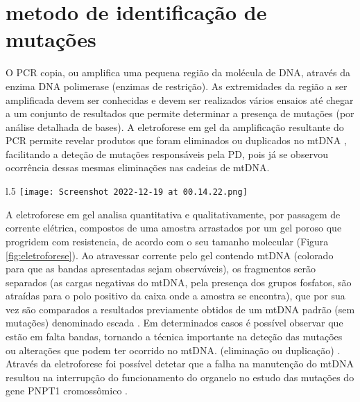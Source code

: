 \documentclass{article}
\begin{document}
    \section{metodo de identificação de mutações}
    O PCR copia, ou amplifica uma pequena região da molécula de DNA, através da enzima DNA polimerase (enzimas de restrição). As extremidades da região a ser amplificada devem ser conhecidas e devem ser realizados vários ensaios até chegar a um conjunto de resultados que permite determinar a presença de mutações (por análise detalhada de bases). A eletroforese em gel da amplificação resultante do PCR permite revelar produtos que foram eliminados ou duplicados no mtDNA \cite{Sofronova:2016aa}, facilitando a deteção de mutações responsáveis pela PD, pois já se observou ocorrência dessas mesmas eliminações nas cadeias de mtDNA.\\
    \begin{wrapfigure}{l}{.5\textwidth}
        \centering
        \vspace{-2ex}
        \texttt{[image: Screenshot 2022-12-19 at 00.14.22.png]}
        \caption{Esquema eletroforese [2022, MUACHO]}
        \label{fig:eletroforese}
        \vspace{-1ex}
    \end{wrapfigure}
    A eletroforese em gel analisa quantitativa e qualitativamente, por passagem de corrente elétrica, compostos de uma amostra arrastados por um gel poroso que progridem com resistencia, de acordo com o seu tamanho molecular (Figura \ref{fig:eletroforese}). Ao atravessar corrente pelo gel contendo mtDNA (colorado para que as bandas apresentadas sejam observáveis), os fragmentos serão separados (as cargas negativas do mtDNA, pela presença dos grupos fosfatos, são atraídas para o polo positivo da caixa onde a amostra se encontra), que por sua vez são comparados a resultados previamente obtidos de um mtDNA padrão (sem mutações) denominado escada \cite{scitable_2014}. Em determinados casos é possível observar que estão em falta bandas, tornando a técnica importante na deteção das mutações ou alterações que podem ter ocorrido no mtDNA. (eliminação ou duplicação) \cite{Diaz:2009aa}.\\

    Através da eletroforese foi possível detetar que a falha na manutenção do mtDNA resultou na interrupção do funcionamento do organelo no estudo das mutações do gene PNPT1 cromossômico \cite{Vedrenne:2012aa}.\\
    
\end{document}
